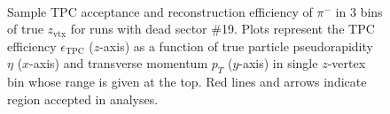 \begin{figure}[h!]
{\begin{subfigure}[b]{\linewidth}
		\end{subfigure}
	}%
	\quad%
	\parbox{0.485\textwidth}{
		\centering
		\begin{subfigure}[b]{\linewidth}\addtocounter{subfigure}{-2}
		\end{subfigure}\\[5pt]
		\begin{minipage}[t][0.78\linewidth][t]{\linewidth}\vspace{10pt}
		\caption[Sample TPC acceptance and reconstruction efficiency of $\pi^{-}$.]{Sample TPC acceptance and reconstruction efficiency of $\pi^{-}$ in 3 bins of true $z_{\text{vtx}}$ for runs with dead sector \#19. Plots represent the TPC efficiency $\epsilon_{\text{TPC}}$ ($z$-axis) as a function of true particle pseudorapidity $\eta$ ($x$-axis) and transverse momentum $p_{T}$ ($y$-axis) in single $z$-vertex bin whose range is given at the top. Red lines and arrows indicate region accepted in analyses.}\label{fig:tpcEff_pion_sample}
		\end{minipage}
	}\vspace{-15pt}
\end{figure}

